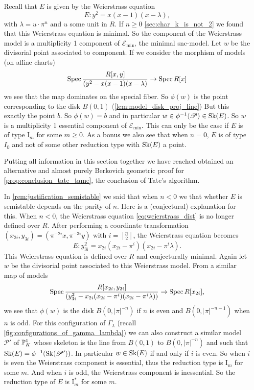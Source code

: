 Recall that $E$ is given by the Weierstrass equation 
\begin{equation}\label{eq:weierstrass_dist}
	E: y^2 = x(x-1)(x-\lambda)
,\end{equation}
with $\lambda = u \cdot \pi^{n}$ and $u$ some unit in $R$. 
If $n \ge 0$ \cref{sec:char_k_is_not_2} we found that this Weierstrass equation is minimal.
So the component of the Weierstrass model is a multiplicity 1 component of $\mathscr E_\text{min} $, the minimal snc-model. 
Let $w$ be the divisorial point associated to component.
If we consider the morphism of models (on affine charts) \[
	\operatorname{Spec} \frac{R[x, y]}{(y^2 - x(x-1)(x-\lambda)} \to \operatorname{Spec} R[x]
\]
we see that the map dominates on the special fiber. 
So $\phi(w)$ is the point corresponding to the disk $B(0, 1)$ (\cref{lem:model_disk_proj_line})
But this exactly the point $b$. So $\phi(w) = b$ and in particular $w \in \phi^{-1}(\mathscr P) \in \sk(E)$. 
So $w$ is a multiplicity 1 essential component of $\mathscr E_\text{min} $.
This can only be the case if $E$ is of type $\mathrm I_{m}$ for some $m \ge 0$. 
As a bonus we also see that when $n = 0$,  $E$ is of type $I_0$ and not of some other reduction type with $\operatorname{Sk}(E)$ a point. 

Putting all information in this section together we have reached obtained an alternative and almost purely Berkovich geometric proof for \cref{prop:conclusion_tate_tame}, the conclusion of Tate's algorithm. 
\medskip

In \cref{rem:justification_semistable} we said that when $n < 0$ we that whether $E$ is semistable depends on the parity of $n$. 
Here is a (conjectural) explanation for this. 
When $n < 0$, the Weierstrass equation \eqref{eq:weierstrass_dist} is no longer defined over $R$. 
After performing a coordinate transformation $(x_{2i}, y_{3i}) = (\pi^{-2i}x, \pi^{-3i}y)$ with $i = \left\lceil \frac{n}{2} \right\rceil $, the Weierstrass equation becomes \[
	E: y_{3i}^2 = x_{2i}(x_{2i}-\pi^{i})(x_{2i} - \pi^{i}\lambda)
.\] 
This Weierstrass equation is defined over $R$ and conjecturally minimal. 
Again let $w$ be the divisorial point associated to this Weierstrass model. 
From a similar map of models \[
	\operatorname{Spec} \frac{R[x_{2i}, y_{2i}]}{\left(y_{3i}^2 - x_{2i}(x_{2i}-\pi^{i})(x_{2i} - \pi^{i}\lambda)\right)} 
	\to \operatorname{Spec} R[x_{2i}]
,\] 
we see that $\phi(w)$ is the disk $B(0, |\pi|^{-n})$ if $n$ is even and $B(0,|\pi|^{-n-1}) $ when $n$ is odd. 
For this configuration of $\Gamma_\lambda$ (recall \cref{fig:configurations_of_gamma_lambda}) we can also construct a similar model $\mathscr P'$ of $\mathbb{P}^{1}_K$ whose skeleton is the line from $B(0, 1)$ to $B(0, |\pi|^{-n})$ and such that $\sk(E) = \phi^{-1}(\sk(\mathscr P'))$.
In particular $w \in \operatorname{Sk}(E)$  if and only if $i$ is even. 
So when $i$ is even the Weierstrass component is essential, thus the reduction type is $\mathrm I_m$ for some $m$. 
And when  $i$ is odd, the Weierstrass component is inessential. 
So the reduction type of $E$ is $\mathrm I_m^*$ for some $m$. 





